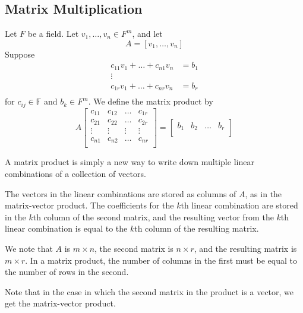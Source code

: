 \documentclass{article}
\newcommand{\F}{\mathbb{F}}
\begin{document}
\subsection{Matrix Multiplication}
\begin{definition}
  Let $F$ be a field. Let $v_1, \ldots, v_n \in F^m$, and let
  \[A = [v_1, \ldots, v_n]\]
  Suppose
  \begin{align*}
    c_{11}v_1 + \dots + c_{n1}v_n &= b_1\\
    \vdots\\
    c_{1r}v_1 + \dots + c_{nr}v_n &= b_r\\
  \end{align*}
  for $c_{ij} \in \F$ and $b_k \in F^m$. We define the matrix product by
  \[A
    \begin{bmatrix}
      c_{11} & c_{12} & \dots & c_{1r}\\
      c_{21} & c_{22} & \dots & c_{2r}\\
      \vdots & \vdots & \vdots& \vdots\\
      c_{n1} & c_{n2} & \dots & c_{nr}\\
    \end{bmatrix}
    =
    \begin{bmatrix}
      b_1 & b_2 & \dots & b_r\\
  \end{bmatrix}\]
\end{definition}
\begin{remark}
  A matrix product is simply a new way to write down multiple linear combinations of a collection of vectors.

  The vectors in the linear combinations are stored as columns of $A$, as in the matrix-vector product. The coefficients for the $k$th linear combination are stored in the $k$th column of the second matrix, and the resulting vector from the $k$th linear combination is equal to the $k$th column of the resulting matrix.

  We note that $A$ is $m \times n$, the second matrix is $n \times r$, and the resulting matrix is $m \times r$. In a matrix product, the number of columns in the first must be equal to the number of rows in the second.

  Note that in the case in which the second matrix in the product is a vector, we get the matrix-vector product.
\end{remark}
\end{document}

